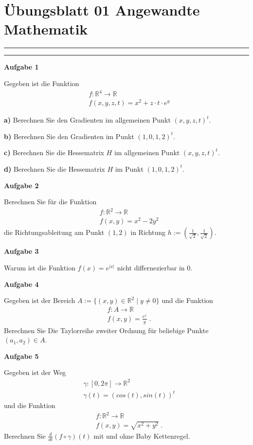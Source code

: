 \documentclass[a4paper,13pt]{scrartcl}
\begin{document}
\section*{\large  Übungsblatt 01 \hfill Angewandte Mathematik }
\hrule
\hrule
\vspace{4mm}
{\bf Aufgabe 1}

Gegeben ist die Funktion 
\begin{align*}
& f : \mathbb{R}^4 \to \mathbb{R} \\
& f(x,y,z,t) = x^2 + z\cdot t \cdot e^y 
\end{align*}

{\bf a)}  Berechnen Sie den Gradienten im allgemeinen Punkt $(x,y,z,t)^t$.

{\bf b)}  Berechnen Sie den Gradienten im  Punkt $(1,0,1,2)^t$.

{\bf c)}  Berechnen Sie die Hessematrix $H$ im allgemeinen Punkt $(x,y,z,t)^t$.

{\bf d)}  Berechnen Sie die Hessematrix $H$ im  Punkt $(1,0,1,2)^t$.


\vspace{8mm}
{\bf Aufgabe 2}

Berechnen Sie für die Funktion 
\begin{align*}
& f : \mathbb{R}^2 \to \mathbb{R} \\
& f(x,y) = x^2  - 2y^2 
\end{align*}
die Richtungsableitung am Punkt $(1,2)$ in Richtung $h:= (\frac{1}{\sqrt{2}}, \frac{1}{\sqrt{2}})$.

\vspace{8mm}
{\bf Aufgabe 3}

Warum ist die Funktion $f(x) = e^{|x|}$ nicht differnezierbar in $0$.


\vspace{8mm}
{\bf Aufgabe 4}

Gegeben ist der Bereich $A:= \{ (x,y) \in \mathbb{R}^2 \; | \;  y \neq 0 \}$ und die Funktion
\begin{align*}
& f : A  \to \mathbb{R} \\
& f(x,y) = \frac{e^x}{y} \;.
\end{align*}
 Berechnen Sie Die Taylorreihe zweiter Ordnung für beliebige Punkte $(a_1, a_2) \in A$.

\vspace{8mm}
{\bf Aufgabe 5}

Gegeben ist der Weg 
\begin{align*}
& \gamma : [0, 2 \pi] \to \mathbb{R}^2 \\
& \gamma(t) = (cos(t), sin(t))^t
\end{align*}
und die Funktion 
\begin{align*}
& f : \mathbb{R}^2 \to\mathbb{R}  \\
& f(x,y) = \sqrt{x^2 + y^2} \;.
\end{align*}
Berechnen Sie $\frac{d}{dt} (f \circ \gamma) (t)$ mit und ohne  Baby Kettenregel.
\end{document}
